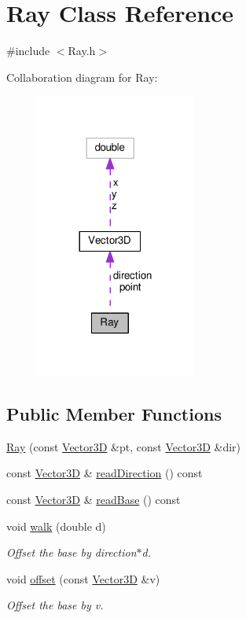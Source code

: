 \hypertarget{classRay}{}\section{Ray Class Reference}
\label{classRay}


{\ttfamily \#include $<$Ray.\+h$>$}



Collaboration diagram for Ray\+:\nopagebreak
\begin{figure}[H]
\begin{center}
\leavevmode
\includegraphics[width=149pt]{classRay__coll__graph}
\end{center}
\end{figure}
\subsection*{Public Member Functions}
\begin{DoxyCompactItemize}
\item 
\hyperlink{classRay_a9fad894cf932e40e035eb93ed880577b}{Ray} (const \hyperlink{classVector3D}{Vector3D} \&pt, const \hyperlink{classVector3D}{Vector3D} \&dir)
\item 
const \hyperlink{classVector3D}{Vector3D} \& \hyperlink{classRay_a00200e8c1064e7ecfd29ce6ee7f8197a}{read\+Direction} () const 
\item 
const \hyperlink{classVector3D}{Vector3D} \& \hyperlink{classRay_ae6d85ff4bc0a04d36f53204cb2bcdc16}{read\+Base} () const 
\item 
void \hyperlink{classRay_af986618fceed92c3c189f8950deb6d21}{walk} (double d)
\begin{DoxyCompactList}\small\item\em Offset the base by direction$\ast$d. \end{DoxyCompactList}\item 
void \hyperlink{classRay_ab5669d08ac75473d52cb4e0ade79b6c1}{offset} (const \hyperlink{classVector3D}{Vector3D} \&v)
\begin{DoxyCompactList}\small\item\em Offset the base by v. \end{DoxyCompactList}\end{DoxyCompactItemize}
